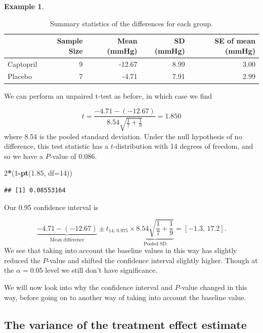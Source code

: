 \documentclass[
  openany]{book}
\newenvironment{Shaded}{\begin{snugshade}}{\end{snugshade}}
\newcommand{\AttributeTok}[1]{\textcolor[rgb]{0.13,0.29,0.53}{#1}}
\newcommand{\DecValTok}[1]{\textcolor[rgb]{0.00,0.00,0.81}{#1}}
\newcommand{\FloatTok}[1]{\textcolor[rgb]{0.00,0.00,0.81}{#1}}
\newcommand{\FunctionTok}[1]{\textcolor[rgb]{0.13,0.29,0.53}{\textbf{#1}}}
\newcommand{\NormalTok}[1]{#1}
\newcommand{\SpecialCharTok}[1]{\textcolor[rgb]{0.81,0.36,0.00}{\textbf{#1}}}
\theoremstyle{definition}
\theoremstyle{definition}
\newtheorem{example}{Example}[chapter]
\theoremstyle{definition}
\theoremstyle{definition}
\theoremstyle{remark}
\begin{document}
\begin{example}
\begin{table}

\caption{\label{tab:captoprildiffsumm}Summary statistics of the differences for each group.}
\centering
\begin{tabular}[t]{l|r|r|r|r}
\hline
  & Sample Size & Mean (mmHg) & SD (mmHg) & SE of mean (mmHg)\\
\hline
Captopril & 9 & -12.67 & 8.99 & 3.00\\
\hline
Placebo & 7 & -4.71 & 7.91 & 2.99\\
\hline
\end{tabular}
\end{table}

We can perform an unpaired t-test as before, in which case we find

\[ t = \frac{-4.71 - (-12.67)}{8.54\sqrt{\frac{1}{7}+\frac{1}{9}}} = 1.850 \]
where 8.54 is the pooled standard deviation. Under the null hypothesis of no difference, this test statistic has a \(t\)-distribution with 14 degrees of freedom, and so we have a \(P\)-value of 0.086.

\begin{Shaded}
\begin{Highlighting}[]
\DecValTok{2}\SpecialCharTok{*}\NormalTok{(}\DecValTok{1}\SpecialCharTok{{-}}\FunctionTok{pt}\NormalTok{(}\FloatTok{1.85}\NormalTok{, }\AttributeTok{df=}\DecValTok{14}\NormalTok{))}
\end{Highlighting}
\end{Shaded}

\begin{verbatim}
## [1] 0.08553164
\end{verbatim}

Our 0.95 confidence interval is

\[\underbrace{-4.71 - (-12.67)}_{\text{Mean difference}} \pm t_{14;\,0.975}\times \underbrace{8.54\sqrt{\frac{1}{7}+\frac{1}{9}}}_{\text{Pooled SD}} = \left[-1.3,\,17.2\right].\]
We see that taking into account the baseline values in this way has slightly reduced the \(P\)-value and shifted the confidence interval slightly higher. Though at the \(\alpha = 0.05\) level we still don't have significance.
\end{example}

We will now look into why the confidence interval and \(P\)-value changed in this way, before going on to another way of taking into account the baseline value.

\subsection{The variance of the treatment effect estimate}\label{the-variance-of-the-treatment-effect-estimate}
\end{document}
